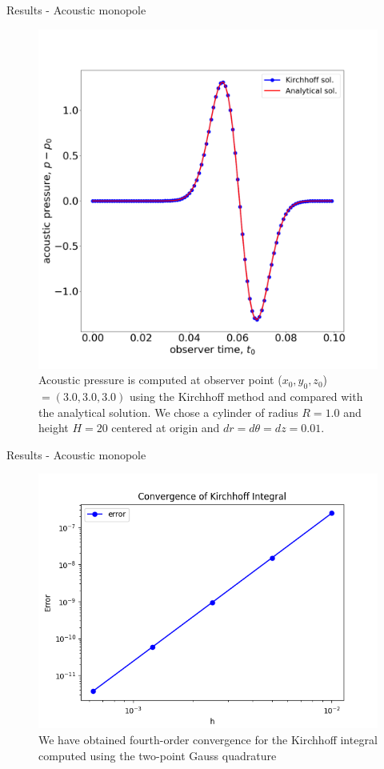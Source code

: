 \documentclass[10pt, aspectratio=169]{beamer}
\begin{document}
\begin{frame}{Results - Acoustic monopole}
	\begin{figure}
		\centering
		\includegraphics[scale=0.17]{images/monopole.png}
		\caption{Acoustic pressure is computed at observer point ($x_{0}, y_{0}, z_{0}$) $= (3.0, 3.0, 3.0)$ using the Kirchhoff method and compared with the analytical solution. We chose a cylinder of radius $R = 1.0$ and height $H = 20$ centered at origin and $dr = d\theta = dz = 0.01$.}
	\end{figure}
\end{frame}

\begin{frame}{Results - Acoustic monopole}
	\begin{figure}
		\centering
		\includegraphics[scale=0.5]{images/convergence.png}
		\caption{We have obtained fourth-order convergence for the Kirchhoff integral computed using the two-point Gauss quadrature}
	\end{figure}
\end{frame}
\end{document}

